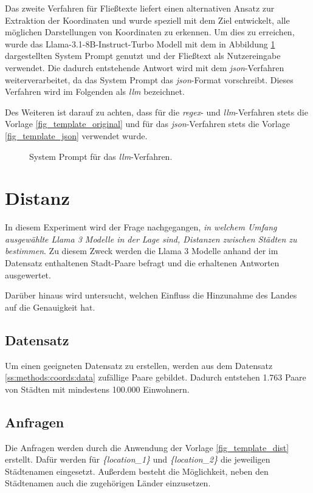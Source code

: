 Das zweite Verfahren für Fließtexte liefert einen alternativen Ansatz zur Extraktion der Koordinaten und wurde speziell mit dem Ziel entwickelt, alle möglichen Darstellungen von Koordinaten zu erkennen.
Um dies zu erreichen, wurde das Llama-3.1-8B-Instruct-Turbo Modell mit dem in Abbildung \ref{fig_template_llm} dargestellten System Prompt genutzt und der Fließtext als Nutzereingabe verwendet.
Die dadurch entstehende Antwort wird mit dem \textit{json}-Verfahren weiterverarbeitet, da das System Prompt das \textit{json}-Format vorschreibt.
Dieses Verfahren wird im Folgenden als \textit{llm} bezeichnet.

Des Weiteren ist darauf zu achten, dass für die \textit{regex}- und \textit{llm}-Verfahren stets die Vorlage \ref{fig_template_original} und für das \textit{json}-Verfahren stets die Vorlage \ref{fig_template_json} verwendet wurde.

\begin{figure}[tb]
    
    \caption{System Prompt für das \textit{llm}-Verfahren.}
    \label{fig_template_llm}
\end{figure}

\section{Distanz}
\label{methods_dist}
In diesem Experiment wird der Frage nachgegangen, \textit{in welchem Umfang ausgewählte Llama 3 Modelle in der Lage sind, Distanzen zwischen Städten zu bestimmen}.
Zu diesem Zweck werden die Llama 3 Modelle anhand der im Datensatz enthaltenen Stadt-Paare befragt und die erhaltenen Antworten ausgewertet.

Darüber hinaus wird untersucht, welchen Einfluss die Hinzunahme des Landes auf die Genauigkeit hat.

\subsection{Datensatz}
Um einen geeigneten Datensatz zu erstellen, werden aus dem Datensatz \ref{ss:methods:coords:data} zufällige Paare gebildet. Dadurch entstehen 1.763 Paare von Städten mit mindestens 100.000 Einwohnern.

\subsection{Anfragen}
Die Anfragen werden durch die Anwendung der Vorlage \ref{fig_template_dist} erstellt.
Dafür werden für \textit{\{location\_1\}} und \textit{\{location\_2\}} die jeweiligen Städtenamen eingesetzt.
Außerdem besteht die Möglichkeit, neben den Städtenamen auch die zugehörigen Länder einzusetzen.

